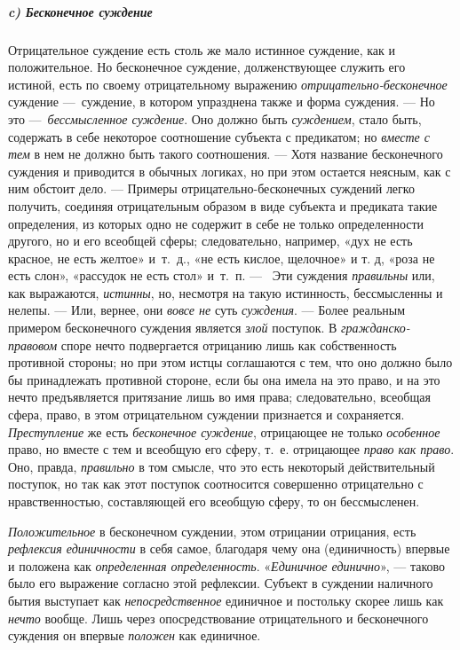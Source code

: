 \documentclass[twoside]{article}
\begin{document}
{{{\subparagraph[c) Бесконечное суждение]{c) Бесконечное суждение}
Отрицательное суждение есть столь же мало истинное суждение,
как и положительное. Но бесконечное суждение, долженствующее служить его
истиной, есть по своему отрицательному выражению
{\em отрицательно-бесконечное}
суждение —~суждение, в котором упразднена
также и форма суждения. — Но это
—~{\em бессмысленное суждение}.
Оно должно быть
{\em суждением}, стало
быть, содержать в себе некоторое соотношение субъекта с предикатом; но
{\em вместе с тем} в нем
не должно быть такого соотношения. — Хотя название
бесконечного суждения и приводится в обычных логиках, но при этом остается
неясным, как с ним обстоит дело. — Примеры
отрицательно-бесконечных суждений легко получить, соединяя отрицательным
образом в виде субъекта и предиката такие определения, из которых одно не
содержит в себе не только определенности другого, но и его всеобщей сферы;
следовательно, например, «дух не есть красное, не есть желтое» и~т.~д., «не
есть кислое, щелочное» и т. д, «роза не есть слон», «рассудок не есть стол»
и~т.~п. — \ Эти суждения
{\em правильны} или, как
выражаются, {\em истинны},
но, несмотря на такую истинность, бессмысленны и нелепы. —
Или, вернее, они
{\em вовсе не} суть
{\em суждения}. — Более
реальным примером бесконечного суждения является
{\em злой} поступок. В
{\em гражданско-правовом}
споре нечто подвергается отрицанию лишь как собственность
противной стороны; но при этом истцы соглашаются с тем, что оно должно было
бы принадлежать противной стороне, если бы она имела на это право, и на это
нечто предъявляется притязание лишь во имя права; следовательно, всеобщая
сфера, право, в этом отрицательном суждении признается и сохраняется.
{\em Преступление} же
есть {\em бесконечное суждение},
отрицающее не только
{\em особенное} право, но
вместе с тем и всеобщую его сферу, т.~е. отрицающее
{\em право как право}.
Оно, правда,
{\em правильно} в том
смысле, что это есть некоторый действительный поступок, но так как этот
поступок соотносится совершенно отрицательно с нравственностью,
составляющей его всеобщую сферу, то он бессмысленен.

{\em Положительное} в
бесконечном суждении, этом отрицании отрицания, есть
{\em рефлексия единичности}
в себя самое, благодаря чему она (единичность) впервые и
положена как {\em определенная
определенность}. «{\em Единичное
единично}», — таково было его выражение согласно этой
рефлексии. Субъект в суждении наличного бытия выступает как
{\em непосредственное}
единичное и постольку скорее лишь как
{\em нечто} вообще. Лишь
через опосредствование отрицательного и бесконечного суждения он впервые
{\em положен} как
единичное.

}}}
\end{document}

